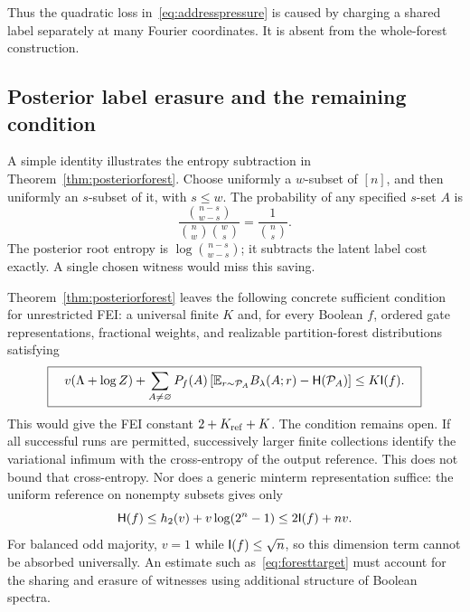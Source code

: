 Thus the quadratic loss in~\eqref{eq:addresspressure} is caused by charging a shared label separately at many Fourier coordinates. It is absent from the whole-forest construction.

\subsection{Posterior label erasure and the remaining condition}

A simple identity illustrates the entropy subtraction in Theorem~\ref{thm:posteriorforest}. Choose uniformly a $w$-subset of $[n]$, and then uniformly an $s$-subset of it, with $s\le w$. The probability of any specified $s$-set $A$ is
\[
 \frac{\binom{n-s}{w-s}}{\binom nw\binom ws}
 =\frac1{\binom ns}.
\]
The posterior root entropy is $\log\binom{n-s}{w-s}$; it subtracts the latent label cost exactly. A single chosen witness would miss this saving.

Theorem~\ref{thm:posteriorforest} leaves the following concrete sufficient condition for unrestricted FEI: a universal finite $K$ and, for every Boolean $f$, ordered gate representations, fractional weights, and realizable partition-forest distributions satisfying
\begin{equation}\label{eq:foresttarget}
 \boxed{\quad
 v(\Lambda+\log Z)+
 \sum_{A\ne\varnothing}P_f(A)
 \left[\mathbb E_{r\sim\mathcal P_A}B_\lambda(A;r)-\mathsf H(\mathcal P_A)\right]
 \le K\mathsf I(f).
 \quad}
\end{equation}
This would give the FEI constant $2+K_{\rm ref}+K$. The condition remains open. If all successful runs are permitted, successively larger finite collections identify the variational infimum with the cross-entropy of the output reference. This does not bound that cross-entropy. Nor does a generic minterm representation suffice: the uniform reference on nonempty subsets gives only
\[
 \mathsf H(f)\le h_2(v)+v\log(2^n-1)\le2\mathsf I(f)+nv.
\]
For balanced odd majority, $v=1$ while $\mathsf I(f)\le\sqrt n$, so this dimension term cannot be absorbed universally. An estimate such as~\eqref{eq:foresttarget} must account for the sharing and erasure of witnesses using additional structure of Boolean spectra.
